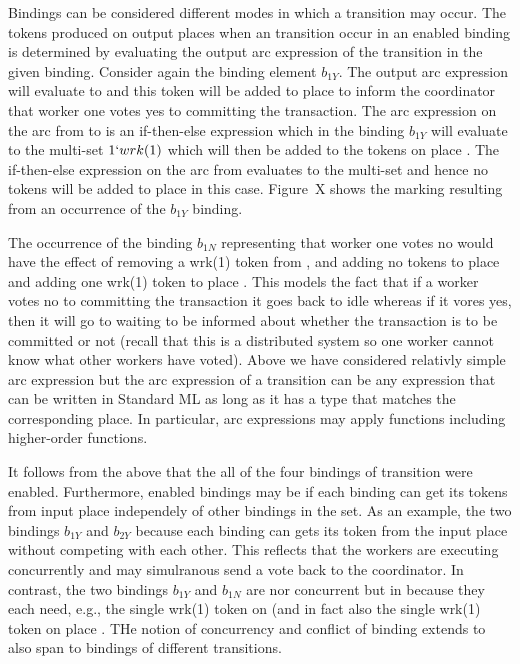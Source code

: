 
Bindings can be considered different modes in which a transition may
occur. The tokens produced on output places when an transition occur
in an enabled binding is determined by evaluating the output arc
expression of the transition in the given binding. Consider again the
binding element $b_{1Y}$. The output arc expression 
will evaluate to  and this token will be added to
place  to inform the coordinator that worker one votes
yes to committing the transaction. The arc expression on the arc from
 to  is an if-then-else
expression which in the binding $b_{1Y}$ will evaluate to the
multi-set $1`wrk(1)$ which will then be added to the tokens on place
. The if-then-else expression on the arc from
 evaluates to the  multi-set
and hence no tokens will be added to place  in this
case. Figure~X shows the marking resulting from an occurrence of the
$b_{1Y}$ binding.

The occurrence of the binding $b_{1N}$ representing that worker one
votes no would have the effect of removing a wrk(1) token from
, and adding no tokens to place  and
adding one wrk(1) token to place . This models the fact
that if a worker votes no to committing the transaction it goes back
to idle whereas if it vores yes, then it will go to waiting to be
informed about whether the transaction is to be committed or not
(recall that this is a distributed system so one worker cannot know
what other workers have voted). Above we have considered relativly
simple arc expression but the arc expression of a transition can be
any expression that can be written in Standard ML as long as it has a
type that matches the corresponding place. In particular, arc
expressions may apply functions including higher-order functions.

It follows from the above that the all of the four bindings of
transition  were enabled. Furthermore,
enabled bindings may be  if each binding
can get its tokens from input place independely of other bindings in
the set. As an example, the two bindings $b_{1Y}$ and $b_{2Y}$ because
each binding can gets its token from the input place without competing
with each other. This reflects that the workers are executing
concurrently and may simulranous send a vote back to the
coordinator. In contrast, the two bindings $b_{1Y}$ and $b_{1N}$ are
nor concurrent but in  because they each need, e.g.,
the single wrk(1) token on  (and in fact also the single
wrk(1) token on place . THe notion of concurrency
and conflict of binding extends to also span to bindings of different
transitions.

